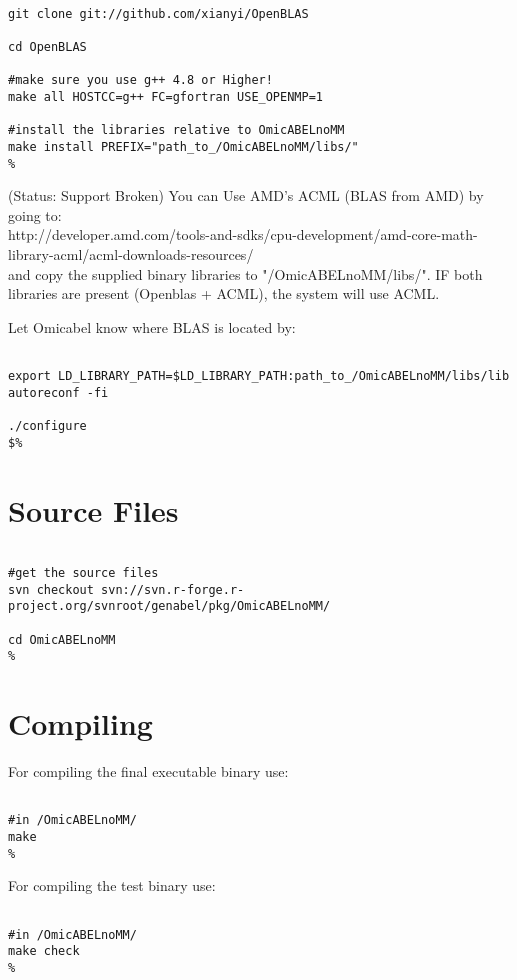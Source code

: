 \documentclass{report}
\begin{document}
\begin{lstlisting}[style=BASH,escapechar=\%]

git clone git://github.com/xianyi/OpenBLAS

cd OpenBLAS

#make sure you use g++ 4.8 or Higher!
make all HOSTCC=g++ FC=gfortran USE_OPENMP=1

#install the libraries relative to OmicABELnoMM
make install PREFIX="path_to_/OmicABELnoMM/libs/"
%
\end{lstlisting}
(Status: Support Broken)
You can Use AMD's ACML (BLAS from AMD) by going to:\\
http://developer.amd.com/tools-and-sdks/cpu-development/amd-core-math-library-acml/acml-downloads-resources/ \\
and copy the supplied binary libraries to "/OmicABELnoMM/libs/". IF both libraries are present (Openblas + ACML), the system will use ACML.

Let Omicabel know where BLAS is located by:


\begin{lstlisting}[style=BASH,escapechar=\%]

export LD_LIBRARY_PATH=$LD_LIBRARY_PATH:path_to_/OmicABELnoMM/libs/lib
autoreconf -fi

./configure
$%
\end{lstlisting}

\section{Source Files}

\begin{lstlisting}[style=BASH,escapechar=\%]

#get the source files
svn checkout svn://svn.r-forge.r-project.org/svnroot/genabel/pkg/OmicABELnoMM/

cd OmicABELnoMM
%
\end{lstlisting}

\section{Compiling}

For compiling the final executable binary use:
\begin{lstlisting}[style=BASH,escapechar=\%]

#in /OmicABELnoMM/
make
%
\end{lstlisting}

For compiling the test binary use:
\begin{lstlisting}[style=BASH,escapechar=\%]

#in /OmicABELnoMM/
make check
%
\end{lstlisting}
\end{document}
